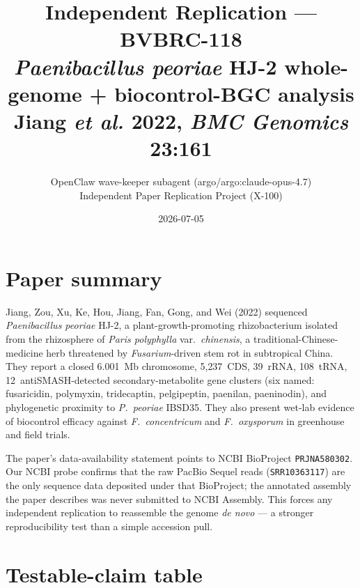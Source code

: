 \documentclass[11pt,a4paper]{article}
\title{Independent Replication --- BVBRC-118 \\
       \large \textit{Paenibacillus peoriae} HJ-2 whole-genome + biocontrol-BGC analysis \\
       Jiang \textit{et al.} 2022, \textit{BMC Genomics} 23:161}
\author{OpenClaw wave-keeper subagent (argo/argo:claude-opus-4.7) \\
        Independent Paper Replication Project (X-100)}
\date{2026-07-05}
\begin{document}
\maketitle

\begin{center}
\end{center}

\tableofcontents

\section{Paper summary}

Jiang, Zou, Xu, Ke, Hou, Jiang, Fan, Gong, and Wei (2022) sequenced \textit{Paenibacillus
peoriae} HJ-2, a plant-growth-promoting rhizobacterium isolated from the rhizosphere of
\textit{Paris polyphylla} var.\ \textit{chinensis}, a traditional-Chinese-medicine herb
threatened by \textit{Fusarium}-driven stem rot in subtropical China. They report a closed
6.001~Mb chromosome, 5{,}237~CDS, 39~rRNA, 108~tRNA, 12~antiSMASH-detected secondary-metabolite
gene clusters (six named: fusaricidin, polymyxin, tridecaptin, pelgipeptin, paenilan,
paeninodin), and phylogenetic proximity to \textit{P.\ peoriae} IBSD35. They also present
wet-lab evidence of biocontrol efficacy against \textit{F.\ concentricum} and
\textit{F.\ oxysporum} in greenhouse and field trials.

The paper's data-availability statement points to NCBI BioProject \texttt{PRJNA580302}. Our
NCBI probe confirms that the raw PacBio Sequel reads (\texttt{SRR10363117}) are the only
sequence data deposited under that BioProject; the annotated assembly the paper describes
was never submitted to NCBI Assembly. This forces any independent replication to reassemble
the genome \emph{de novo} --- a stronger reproducibility test than a simple accession pull.

\section{Testable-claim table}
\end{document}
